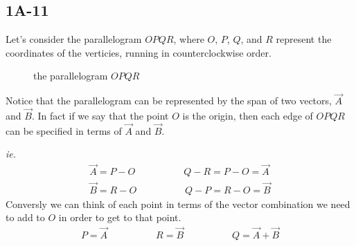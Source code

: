 \documentclass[main.tex]{subfiles}
\begin{document}
\subsection*{1A-11}


Let's consider the parallelogram $OPQR$, where $O$, $P$, $Q$, and $R$
represent the coordinates of the verticies, running in counterclockwise
order.

\begin{figure}[!h]
\centering
{}
\caption{the parallelogram $OPQR$}
\end{figure}

Notice that the parallelogram can be represented by the span of two vectors,
$\vec{A}$ and $\vec{B}$.
In fact if we say that the point $O$ is the origin, then each edge of $OPQR$
can be specified in terms of $\vec{A}$ and $\vec{B}$.


\begin{tcolorbox}[boxsep=.5mm, boxrule=.1pt]
\textit{ie.}\\
\begin{align*}
\vec{A} = P - O \hspace{5em}
Q-R = P-O = \vec{A}\\
\vec{B} = R - O\hspace{5em}
Q-P = R-O = \vec{B}
\end{align*}
\tcblower
Conversly we can think of each point in terms of the vector combination we need to
add to $O$ in order to get to that point.
\begin{align*}
P = \vec{A} \hspace{5em}
R = \vec{B} \hspace{5em}
Q = \vec{A} + \vec{B}
\end{align*}
\end{tcolorbox}
\end{document}
